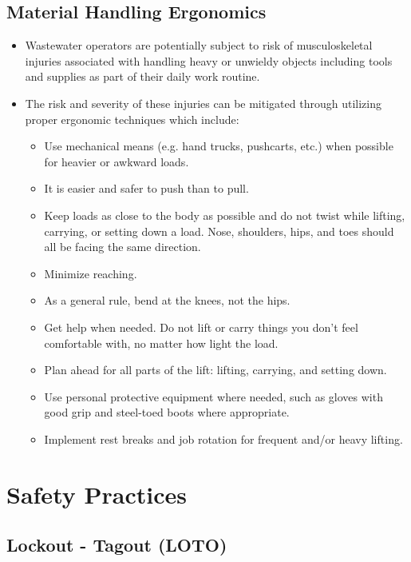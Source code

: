 \subsection{Material Handling Ergonomics}
\begin{itemize}
\item Wastewater operators are potentially subject to risk of musculoskeletal injuries associated with handling heavy or unwieldy objects including tools and supplies as part of their daily work routine.
\item The risk and severity of these injuries can be mitigated through utilizing proper ergonomic techniques which include:
\begin{itemize}
\item Use mechanical means (e.g. hand trucks, pushcarts, etc.) when possible for heavier or awkward loads.
\item It is easier and safer to push than to pull.
\item Keep loads as close to the body as possible and do not twist while lifting, carrying, or setting down a load. Nose, shoulders, hips, and toes should all be facing the same direction.
\item Minimize reaching.
\item As a general rule, bend at the knees, not the hips.
\item Get help when needed. Do not lift or carry things you don’t feel comfortable with, no matter how light the load.
\item Plan ahead for all parts of the lift: lifting, carrying, and setting down.
\item Use personal protective equipment where needed, such as gloves with good grip and steel-toed boots where appropriate.
\item Implement rest breaks and job rotation for frequent and/or heavy lifting.
\end{itemize}
\end{itemize}



\section{Safety Practices}


\subsection{Lockout - Tagout (LOTO)}


